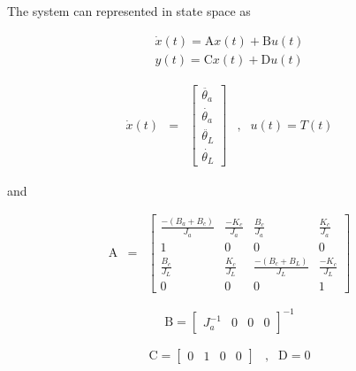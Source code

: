 \noindent The system can represented in state space as

\begin{equation}
\begin{array}{c}
\dot{x}(t) = \mbox{A}x(t) + \mbox{B}u(t) \\
y(t) = \mbox{C}x(t) + \mbox{D}u(t)
\end{array}
\end{equation}

\begin{equation}\label{eq:ssTR}
\begin{array}{llllll}

\dot{x}(t)
&

 =

&

 
\left[
\begin{array}{l}
\ddot{\theta_a} 	\\ 
\dot{\theta_a}		\\
\ddot{\theta_L}	\\
\dot{\theta_L}
\end{array}
\right]



&


,


&

u(t) =T(t)


\end{array}
\end{equation}


and


\begin{equation}
\begin{array}{ccc}
\mbox{A}
&
=
&

\left[
\begin{array}{cccc}
\frac{-(B_a+B_c)}{J_a}   	& \frac{-K_c}{J_a}   	& \frac{B_c}{J_a}   		&	\frac{K_c}{J_a} \\
1 					& 0				& 0					&	0			\\
\frac{B_c}{J_L}			& \frac{K_c}{J_L}	& \frac{-(B_c+B_L)}{J_L}	& 	\frac{-K_c}{J_L} \\
0					& 0				& 0					&	1		
\end{array}

\right]


\end{array}
\end{equation}



\begin{equation}
\mbox{B} = 
\left[
\begin{array}{cccc}
J^{-1}_a 	&
0		&
0		&
0
\end{array}
\right]^{-1}
\end{equation}

\begin{equation}
\begin{array}{ccc}
\mbox{C}
=
\left[
\begin{array}{cccc}
0 	&	1	&	0	&	0
\end{array}
\right]
&
,
&
\mbox{D} = 0
\end{array}
\end{equation}
